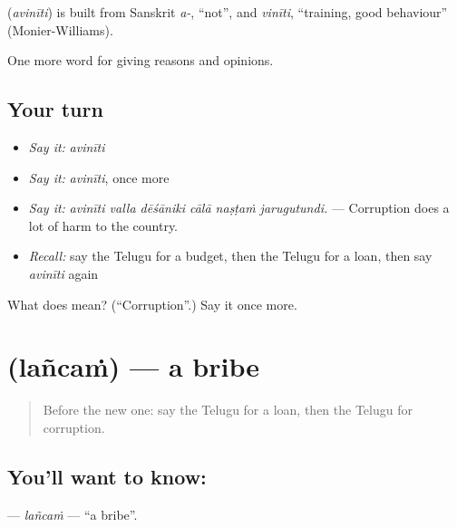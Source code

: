 \begin{cousinweb}
\textbf{} (\emph{avinīti}) is built from Sanskrit \emph{a-}, \textquotedblleft{}not\textquotedblright{}, and \emph{vinīti}, \textquotedblleft{}training, good behaviour\textquotedblright{} (Monier-Williams).
\end{cousinweb}

\begin{grammarlens}[title={What you've built}]
One more word for giving reasons and opinions.
\end{grammarlens}

\subsection*{Your turn}
\begin{itemize}
\raggedright
  \item \emph{Say it:} \emph{avinīti}
  \item \emph{Say it:} \emph{avinīti}, once more
  \item \emph{Say it:} \emph{avinīti valla dēśāniki cālā naṣṭaṁ jarugutundi.} — Corruption does a lot of harm to the country.
  \item \emph{Recall:} say the Telugu for a budget, then the Telugu for a loan, then say \emph{avinīti} again
\end{itemize}

\begin{tcolorbox}[breakable,colback=teal!4,colframe=teal!35!black,title={Before you move on}]
What does  mean? (\textquotedblleft{}Corruption\textquotedblright{}.) Say it once more.
\end{tcolorbox}
\section[\texorpdfstring{\te{లంచం} (lañcaṁ)}{లంచం (lañcaṁ)}]{ (lañcaṁ) — a bribe}

\label{lesson:TE-C406-lancam}



\begin{quote}
Before the new one: say the Telugu for a loan, then the Telugu for corruption.
\end{quote}

\subsection*{You'll want to know: }
\textbf{} — \emph{lañcaṁ} — \textquotedblleft{}a bribe\textquotedblright{}.

